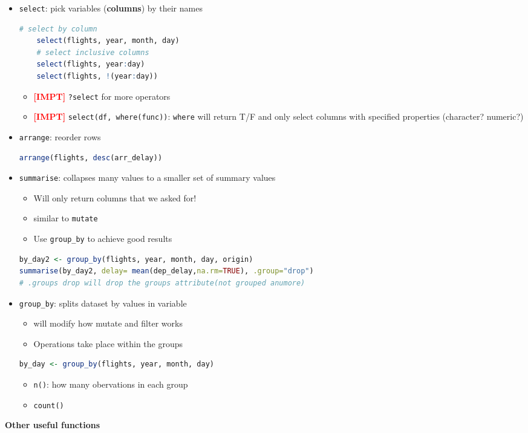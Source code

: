 \documentclass{article}
\newcommand{\impt}[0]{\textcolor{red}{\textbf{[IMPT] }}}
\begin{document}
\begin{multicols}{2}
\begin{itemize}
\begin{itemize}
    \item \impt \texttt{cummean()}
    \item \impt \texttt{rank()}: \texttt{min\_rank()}, \texttt{min\_rank(desc(x))}, \texttt{dense\_rank}
    \item \texttt{col = NULL}: delete a column when doing \texttt{mutate}
\end{itemize}
	\item \texttt{select}: pick variables (\textbf{columns}) by their names
	\begin{lstlisting}[language=R]
	# select by column
	select(flights, year, month, day)
	# select inclusive columns
	select(flights, year:day)
	select(flights, !(year:day))\end{lstlisting}
\begin{itemize}
	\item \impt \texttt{?select} for more operators
	\item \impt \texttt{select(df, where(func))}: \texttt{where} will return T/F and only select columns with specified properties (character? numeric?)
\end{itemize}
	\item \texttt{arrange}: reorder rows
\begin{lstlisting}[language=R]
arrange(flights, desc(arr_delay))
\end{lstlisting}
	\item \texttt{summarise}: collapses many values to a smaller set of summary values
	\begin{itemize}
		\item Will only return columns that we asked for!
		\item similar to \texttt{mutate}
		\item Use \texttt{group\_by} to achieve good results
	\end{itemize}
\begin{lstlisting}[language=R]
by_day2 <- group_by(flights, year, month, day, origin)
summarise(by_day2, delay= mean(dep_delay,na.rm=TRUE), .group="drop")
# .groups drop will drop the groups attribute(not grouped anumore)
\end{lstlisting}
	\item \texttt{group\_by}: splits dataset by values in variable
	\begin{itemize}
		\item will modify how mutate and filter works
		\item Operations take place within the groups
	\end{itemize}
\begin{lstlisting}[language=R]
by_day <- group_by(flights, year, month, day)
\end{lstlisting}
\begin{itemize}
	\item \texttt{n()}: how many obervations in each group
	\item \texttt{count()}
\end{itemize}
\end{itemize}
\vspace{1em}
\textbf{Other useful functions}


\end{multicols}
\end{document}
